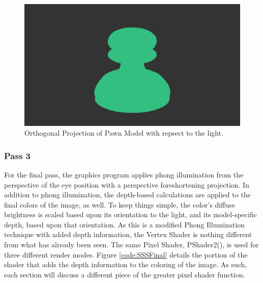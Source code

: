 \documentclass[a4paper, 12pt]{article}
\begin{document}
\begin{figure}[!htb]
	\centering
	\includegraphics[width=1.0\textwidth]{orthoPawn.jpg}
	\caption{Orthogonal Projection of Pawn Model with repsect to the light.}
	\label{pic:orthoPawn}
\end{figure}

\subsubsection{Pass 3}

\label{section:SSSPass3}

For the final pass, the graphics program applies phong illumination from the
perspective of the eye position with a perspective foreshortening projection.
In addition to phong illumination, the depth-based calculations are applied to
the final colors of the image, as well. To keep things simple, the color's
diffuse brightness is scaled based upon its orientation to the light, and its
model-specific depth, based upon that orientation. As this is a modified Phong
Illumination technique with added depth information, the Vertex Shader is
nothing different from what has already been seen. The same Pixel Shader,
PShader2(), is used for three different render modes. Figure
\ref{code:SSSFinal} details the portion of the shader that adds the depth
information to the coloring of the image. As such, each section will discuss a
different piece of the greater pixel shader function.
\end{document}
